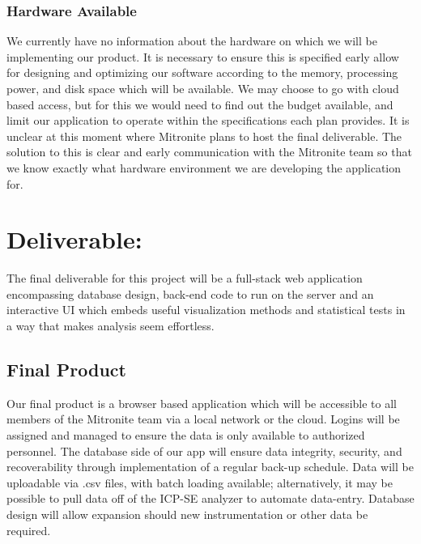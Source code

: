 \documentclass[10pt,twocolumn,letterpaper]{article}
\begin{document}
            \subsubsection{Hardware Available}
                     We currently have no information about the hardware on which we will be implementing our product. 
		     It is necessary to ensure this is specified early allow for designing and optimizing our software according to the memory, processing power, and disk space which 
		     will be available. 
		     We may choose to go with cloud based access, but for this we would need to find out the budget available, and limit our application to operate within the 
		     specifications each plan provides. 
		     It is unclear at this moment where Mitronite plans to host the final deliverable.
		     The solution to this is clear and early communication with the Mitronite team so that we know exactly what hardware environment we are developing the application 
		     for. 

    	\section{Deliverable:}

        The final deliverable for this project will be a full-stack web application encompassing database design, back-end code to run on the server and an interactive UI which embeds useful visualization methods and statistical tests in a way that makes analysis seem effortless.

            \subsection{Final Product}

            Our final product is a browser based application which will be accessible to all members of the Mitronite team via a local network or the cloud. Logins will be assigned and 
	    managed to ensure the data is only available to authorized personnel. 
	    The database side of our app will ensure data integrity, security, and recoverability through implementation of a regular back-up schedule. 
	    Data will be uploadable via .csv files, with batch loading available; alternatively, it may be possible to pull data off of the ICP-SE analyzer to automate data-entry. 
	    Database design will allow expansion should new instrumentation or other data be required.
\end{document}
